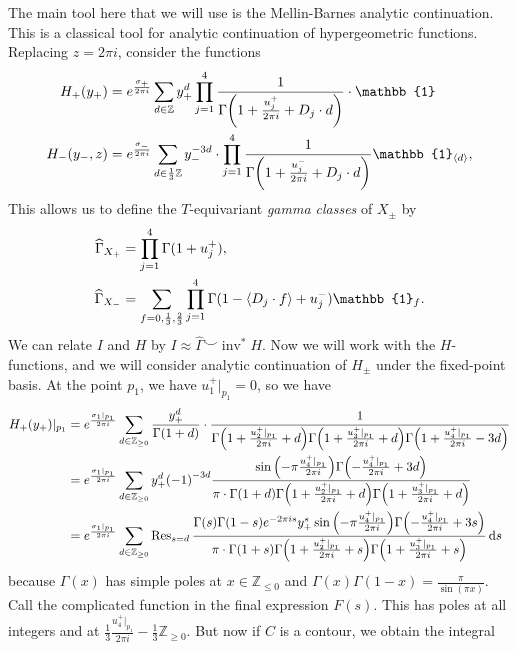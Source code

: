 \documentclass[leqno, openany]{memoir}
\theoremstyle{definition}
\theoremstyle{remark}
\theoremstyle{plain}
\theoremstyle{definition}
\theoremstyle{remark}
\newcommand{\Z}{\mathbb{Z}}
\newcommand{\on}[1]{\operatorname{#1}}
\newcommand{\wh}[1]{\widehat{#1}}
\begin{document}
The main tool here that we will use is the Mellin-Barnes analytic continuation. This is a classical tool for analytic continuation of hypergeometric functions. Replacing $z = 2 \pi i$, consider the functions
\begin{align*}
    H_+(y_+) &= e^{\frac{\sigma_+}{2 \pi i}} \sum_{d \in \Z} y_+^d \prod_{j=1}^4 \frac{1}{\Gamma\qty(1 + \frac{u_j^+}{2 \pi i} + D_j \cdot d)} \cdot \mathbb{1} \\
    H_-(y_-, z) &= e^{\frac{\sigma_-}{2 \pi i}} \sum_{d \in \frac{1}{3}\Z} y_-^{-3d} \cdot \prod_{j=1}^4 \frac{1}{\Gamma\qty(1 + \frac{u_j^-}{2 \pi i}+D_j \cdot d)}  \mathbb{1}_{\ev{d}},
\end{align*}
This allows us to define the $T$-equivariant \textit{gamma classes} of $X_{\pm}$ by
\begin{align*}
    \wh{\Gamma}_{X_+} &= \prod_{j=1}^4 \Gamma(1 + u_j^+), \\
    \wh{\Gamma}_{X_-} &= \sum_{f = 0,\frac{1}{3}, \frac{2}{3}} \prod_{j=1}^4 \Gamma(1 - \ev{D_j \cdot f} + u_j^-) \mathbb{1}_f.
\end{align*}
We can relate $I$ and $H$ by $I \approx \wh{\Gamma} \smile \on{inv}^* H$. Now we will work with the $H$-functions, and we will consider analytic continuation of $H_{\pm}$ under the fixed-point basis. At the point $p_1$, we have $u_1^+ |_{p_1} = 0$, so we have
\begin{align*}
    H_+(y_+) |_{p_1} &= e^{\frac{\sigma_1 |_{p_1}}{2 \pi i}} \sum_{d \in \Z_{\geq 0}} \frac{y_+^d}{\Gamma(1+d)} \cdot \frac{1}{\Gamma\qty(1 + \frac{u_2^+ |_{p_1}}{2\pi i} + d)\Gamma\qty(1 + \frac{u_3^+ |_{p_1}}{2\pi i} + d)\Gamma\qty(1 + \frac{u_4^+ |_{p_1}}{2\pi i} - 3d)} \\
    &= e^{\frac{\sigma_1 |_{p_1}}{2 \pi i}} \sum_{d \in \Z_{\geq 0}} y_+^d {(-1)}^{-3d} \frac{\sin\qty(-\pi \frac{u_4^+|_{p_1}}{2 \pi i}) \Gamma\qty(-\frac{u_4^+|_{p_1}}{2\pi i} + 3d)}{\pi\cdot  \Gamma(1+d) \Gamma\qty(1+\frac{u_2^+|_{p_1}}{2\pi i}+d)\Gamma\qty(1+\frac{u_3^+|_{p_1}}{2\pi i}+d)} \\
    &= e^{\frac{\sigma_1 |_{p_1}}{2 \pi i}} \sum_{d \in \Z_{\geq 0}} \on{Res}_{s=d} \frac{\Gamma(s) \Gamma(1-s) e^{-2\pi i s} y_+^s\sin\qty(-\pi \frac{u_4^+|_{p_1}}{2 \pi i}) \Gamma\qty(-\frac{u_4^+|_{p_1}}{2\pi i} + 3s)}{\pi\cdot  \Gamma(1+s) \Gamma\qty(1+\frac{u_2^+|_{p_1}}{2\pi i}+s)\Gamma\qty(1+\frac{u_3^+|_{p_1}}{2\pi i}+s)} \dd{s}
\end{align*}
because $\Gamma(x)$ has simple poles at $x \in \Z_{\leq 0}$ and $\Gamma(x) \Gamma(1-x) = \frac{\pi}{\sin(\pi x)}$. Call the complicated function in the final expression $F(s)$. This has poles at all integers and at $\frac{1}{3} \frac{u_4^+|_{p_1}}{2 \pi i} - \frac{1}{3} \Z_{\geq 0}$. But now if $C$ is a contour, we obtain the integral
\end{document}
